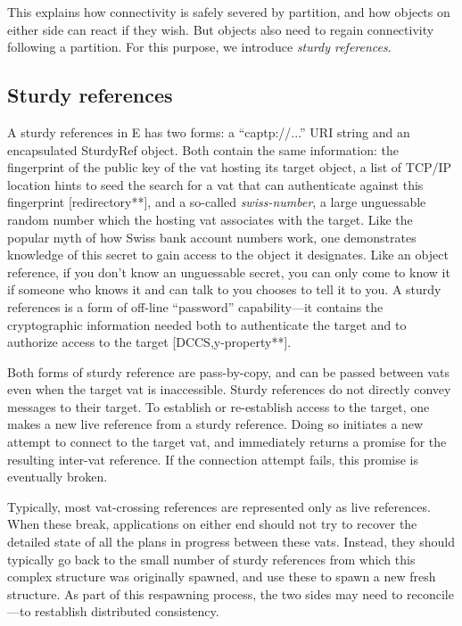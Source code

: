 \documentclass{llncs}
\begin{document}
This explains how connectivity is safely severed by partition, and how
objects on either side can react if they wish. But objects also need
to regain connectivity following a partition. For this purpose, we
introduce \emph{sturdy references}.

\subsection{Sturdy references}

A sturdy references in E has two forms: a ``captp://...'' URI string
and an encapsulated SturdyRef object. Both contain the same
information: the fingerprint of the public key of the vat hosting its
target object, a list of TCP/IP location hints to seed the search for
a vat that can authenticate against this fingerprint [redirectory**],
and a so-called \emph{swiss-number}, a large unguessable random number
which the hosting vat associates with the target. Like the popular
myth of how Swiss bank account numbers work, one demonstrates
knowledge of this secret to gain access to the object it designates.
Like an object reference, if you don't know an unguessable secret, you
can only come to know it if someone who knows it and can talk to you
chooses to tell it to you. A sturdy references is a form of off-line
``password'' capability---it contains the cryptographic information
needed both to authenticate the target and to authorize access to the
target [DCCS,y-property**].

Both forms of sturdy reference are pass-by-copy, and can be passed
between vats even when the target vat is inaccessible. Sturdy
references do not directly convey messages to their target. To
establish or re-establish access to the target, one makes a new live
reference from a sturdy reference. Doing so initiates a new attempt to
connect to the target vat, and immediately returns a promise for the
resulting inter-vat reference. If the connection attempt fails, this
promise is eventually broken.

Typically, most vat-crossing references are represented only as live
references. When these break, applications on either end should not
try to recover the detailed state of all the plans in progress between
these vats. Instead, they should typically go back to the small number
of sturdy references from which this complex structure was originally
spawned, and use these to spawn a new fresh structure. As part of this
respawning process, the two sides may need to reconcile---to
restablish distributed consistency.
\end{document}
